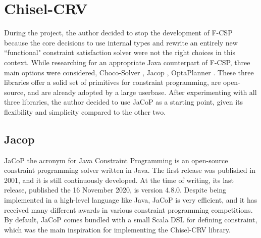 \chapter{Chisel-CRV}\label{chiselcrv}
During the project, the author decided to stop the development of F-CSP because
the core decisions to use internal types and rewrite an entirely new
``functional" constraint satisfaction solver were not the right choices in this
context. While researching for an appropriate Java counterpart of F-CSP, three
main options were considered, Choco-Solver \cite{prudchoco4}, Jacop
\cite{online:jacop}, OptaPlanner \cite{online:optaplanner}. These three
libraries offer a solid set of primitives for constraint programming, are
open-source, and are already adopted by a large userbase. After experimenting
with all three libraries, the author decided to use JaCoP as a starting point,
given its flexibility and simplicity compared to the other two.

\section{Jacop}
JaCoP \cite{online:jacop} the acronym for Java Constraint Programming is an
open-source constraint programming solver written in Java. The first release was
published in 2001, and it is still continuously developed. At the time of
writing, its last release, published the 16 November 2020, is version 4.8.0.
Despite being implemented in a high-level language like Java, JaCoP is very
efficient, and it has received many different awards in various constraint
programming competitions. By default, JaCoP comes bundled with a small Scala DSL
for defining constraint, which was the main inspiration for implementing the
Chisel-CRV library.

